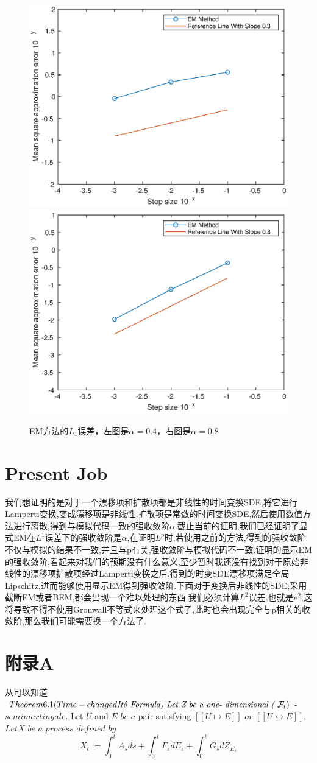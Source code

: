 \documentclass[12pt,final]{article}
\numberwithin{equation}{section}
\numberwithin{figure}{section}
\numberwithin{table}{section}
\theoremstyle{plain}
\theoremstyle{definition}
\theoremstyle{remark}
\begin{document}
\begin{figure}[htp!]
	\centering
	\includegraphics[width=0.45\linewidth]{EMalpha=0.3.eps}
	\hfill
	\includegraphics[width=0.45\linewidth]{EMalpha=0.8.eps}
	\caption{EM方法的$L_1$误差，左图是$\alpha=0.4$，右图是$\alpha=0.8$}
	\label{fig:image}
	\vspace{-2ex}
\end{figure}

\section{Present Job}
我们想证明的是对于一个漂移项和扩散项都是非线性的时间变换SDE,将它进行Lamperti变换,变成漂移项是非线性,扩散项是常数的时间变换SDE,然后使用数值方法进行离散,得到与模拟代码一致的强收敛阶$\alpha$.截止当前的证明,我们已经证明了显式EM在$L^1$误差下的强收敛阶是$\alpha$,在证明$L^p$时,若使用之前的方法,得到的强收敛阶不仅与模拟的结果不一致,并且与p有关,强收敛阶与模拟代码不一致.证明的显示EM的强收敛阶,看起来对我们的预期没有什么意义,至少暂时我还没有找到对于原始非线性的漂移项扩散项经过Lamperti变换之后,得到的时变SDE漂移项满足全局Lipschitz,进而能够使用显示EM得到强收敛阶.下面对于变换后非线性的SDE,采用截断EM或者BEM,都会出现一个难以处理的东西,我们必须计算$L^2$误差,也就是$e^2$,这将导致不得不使用Gronwall不等式来处理这个式子,此时也会出现完全与p相关的收敛阶,那么我们可能需要换一个方法了.
\appendix
\renewcommand{\appendixname}{附录} %

\section{附录A}\label{appendix A}
从\cite{umarov2018beyond}可以知道
$Theorem6. 1( Time- changed \textit{It\^{o} Formula)$ $ Let Z be a one- dimensional ( }\mathcal{F} _t)$- $semimartingale.$ Let $U$ and $E$ $be$ $a$ pair satisfying $[ [ U\longmapsto E] ]$ $or$ $[ [ U\longleftrightarrow E] ] .$ $LetX\textit{ be a process defined by}$
$$X_t:=\int_0^tA_sds+\int_0^tF_sdE_s+\int_0^tG_sdZ_{E_s}$$
\end{document}
